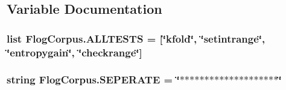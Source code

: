 \subsection{Variable Documentation}
\hypertarget{namespaceFlogCorpus_a04921d2c9ac432c32b739f901d16ddd2}{
\subsubsection[{A\-L\-L\-T\-E\-S\-T\-S}]{\setlength{\rightskip}{0pt plus 5cm}list Flog\-Corpus.\-A\-L\-L\-T\-E\-S\-T\-S = \mbox{[}\char`\"{}kfold\char`\"{}, \char`\"{}setintrange\char`\"{}, \char`\"{}entropygain\char`\"{}, \char`\"{}checkrange\char`\"{}\mbox{]}}}\label{namespaceFlogCorpus_a04921d2c9ac432c32b739f901d16ddd2}
\hypertarget{namespaceFlogCorpus_a4c964280a15bad02d7087b10d7f6100a}{
\subsubsection[{S\-E\-P\-E\-R\-A\-T\-E}]{\setlength{\rightskip}{0pt plus 5cm}string Flog\-Corpus.\-S\-E\-P\-E\-R\-A\-T\-E = \char`\"{}$\ast$$\ast$$\ast$$\ast$$\ast$$\ast$$\ast$$\ast$$\ast$$\ast$$\ast$$\ast$$\ast$$\ast$$\ast$$\ast$$\ast$$\ast$$\ast$$\ast$\char`\"{}}}\label{namespaceFlogCorpus_a4c964280a15bad02d7087b10d7f6100a}
